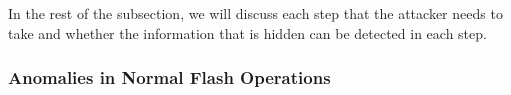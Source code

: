 In the rest of the subsection, we will discuss each step that the attacker
needs
to take and whether the information that is hidden can be 
detected in each step.


\subsubsection{Anomalies in Normal Flash Operations}







